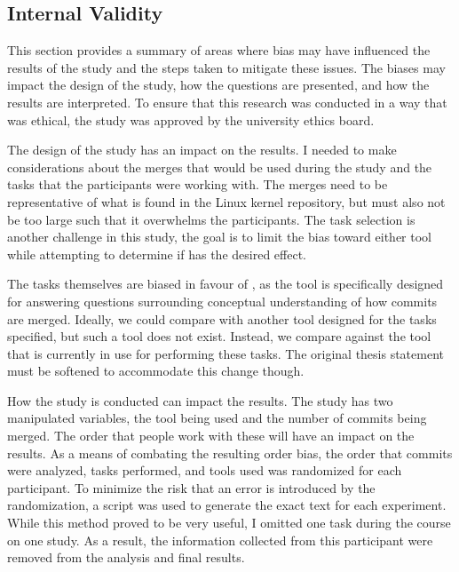 \subsection{Internal Validity}\label{sub:internal_validity}

This section provides a summary of areas where bias may have influenced
the results of the study and the steps taken to mitigate these issues.
The biases may impact the design of the study, how the questions are
presented, and how the results are interpreted.
To ensure that this research was conducted in a way that was ethical,
the study was approved by the university ethics board.

The design of the study has an impact on the results.
I needed to make considerations about the merges that would be used
during the study and the tasks that the participants were working with.
The merges need to be representative of what is found in the Linux
kernel repository, but must also not be too large such that it
overwhelms the participants.
The task selection is another challenge in this study, the goal is to
limit the bias toward either tool while attempting to determine if
\tool{} has the desired effect.


The tasks themselves are biased in favour of \tool{}, as the tool is
specifically designed for answering questions surrounding conceptual
understanding of how commits are merged.
Ideally, we could compare \tool{} with another tool designed for the
tasks specified, but such a tool does not exist.
Instead, we compare against the tool that is currently in use for
performing these tasks.
The original thesis statement must be softened to accommodate this
change though.

How the study is conducted can impact the results.
The study has two manipulated variables, the tool being used and the
number of commits being merged.
The order that people work with these will have an impact on the
results.
As a means of combating the resulting order bias, the order that commits
were analyzed, tasks performed, and tools used was randomized for each
participant.
To minimize the risk that an error is introduced by the randomization, a
script was used to generate the exact text for each experiment.
While this method proved to be very useful,
I omitted one task during the course on one study.
As a result, the information collected from this participant were
removed from the analysis and final results.

